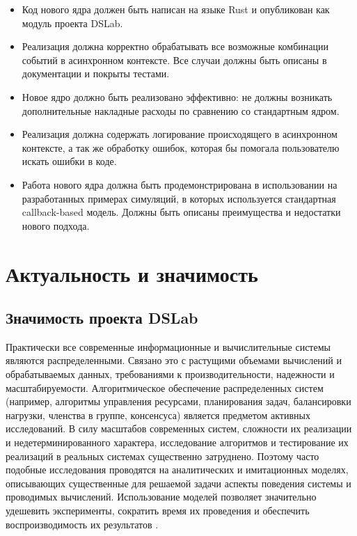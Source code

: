 \begin{itemize}
    \item Код нового ядра должен быть написан на языке Rust и опубликован как модуль проекта DSLab.
    \item Реализация должна корректно обрабатывать все возможные комбинации событий в асинхронном контексте. Все случаи должны быть описаны в документации и покрыты тестами.
    \item Новое ядро должно быть реализовано эффективно: не должны возникать дополнительные накладные расходы по сравнению со стандартным ядром.
    \item Реализация должна содержать логирование происходящего в асинхронном контексте, а так же обработку ошибок, которая бы помогала пользователю искать ошибки в коде. 
    \item Работа нового ядра должна быть продемонстрирована в использовании на разработанных примерах симуляций, в которых используется стандартная callback-based модель. Должны быть описаны преимущества и недостатки нового подхода.
\end{itemize}

\section{Актуальность и значимость}

\subsection{Значимость проекта DSLab}

Практически все современные информационные и вычислительные системы являются распределенными. Связано это с растущими объемами вычислений и обрабатываемых данных, требованиями к производительности, надежности и масштабируемости. Алгоритмическое обеспечение распределенных систем (например, алгоритмы управления ресурсами, планирования задач, балансировки нагрузки, членства в группе, консенсуса) является предметом активных исследований. В силу масштабов современных систем, сложности их реализации и недетерминированного характера, исследование алгоритмов и тестирование их реализаций в реальных системах существенно затруднено. Поэтому часто подобные исследования проводятся на аналитических и имитационных моделях, описывающих существенные для решаемой задачи аспекты поведения системы и проводимых вычислений. Использование моделей позволяет значительно удешевить эксперименты, сократить время их проведения и обеспечить воспроизводимость их результатов \cite{dslab-description}. 

